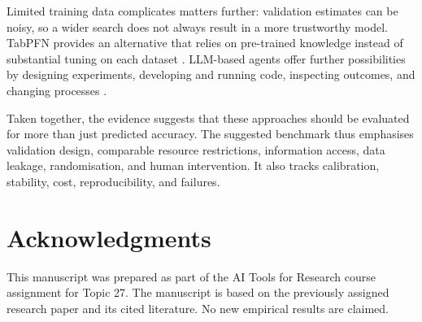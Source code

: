 \documentclass[acmsmall,screen]{acmart}
\begin{document}
Limited training data complicates matters further: validation estimates can be noisy, so a wider search does not always result in a more trustworthy model. TabPFN provides an alternative that relies on pre-trained knowledge instead of substantial tuning on each dataset \cite{hollmann2023}. LLM-based agents offer further possibilities by designing experiments, developing and running code, inspecting outcomes, and changing processes \cite{trirat2025}.

Taken together, the evidence suggests that these approaches should be evaluated for more than just predicted accuracy. The suggested benchmark thus emphasises validation design, comparable resource restrictions, information access, data leakage, randomisation, and human intervention. It also tracks calibration, stability, cost, reproducibility, and failures.

\section*{Acknowledgments}
This manuscript was prepared as part of the AI Tools for Research course assignment for Topic 27. The manuscript is based on the previously assigned research paper and its cited literature. No new empirical results are claimed.



\end{document}
